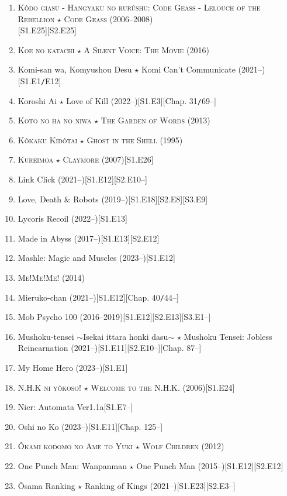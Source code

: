 \documentclass{article}
\begin{document}
\begin{enumerate}
    \item \textsc{Kôdo giasu - Hangyaku no rurûshu: Code Geass - Lelouch of the Rebellion $\star$ Code Geass} (2006--2008)\\\mbox{}\hfill[S1.E25][S2.E25]
    \item \textsc{Koe no katachi $\star$ A Silent Voice: The Movie} (2016)
    \item Komi-san wa, Komyushou Desu $\star$ Komi Can't Communicate (2021--)\hfill[S1.E1\texttt{/}E12]
    \item Koroshi Ai $\star$ Love of Kill (2022--)\hfill[S1.E3][Chap. 31\texttt{/}69--]
    \item \textsc{Koto no ha no niwa $\star$ The Garden of Words} (2013)
    \item \textsc{K\^okaku Kid\^otai $\star$ Ghost in the Shell} (1995)
    \item \textsc{Kureimoa $\star$ Claymore} (2007)\hfill[S1.E26]
    \item Link Click (2021--)\hfill[S1.E12][S2.E10--]
    \item Love, Death \& Robots (2019--)\hfill[S1.E18][S2.E8][S3.E9]
    \item Lycoris Recoil (2022--)\hfill[S1.E13]
    \item Made in Abyss (2017--)\hfill[S1.E13][S2.E12]
    \item Mashle: Magic and Muscles (2023--)\hfill[S1.E12]
    \item \textsc{Me!Me!Me!} (2014)
    \item Mieruko-chan (2021--)\hfill[S1.E12][Chap. 40\texttt{/}44--]
    \item Mob Psycho 100 (2016--2019)\hfill[S1.E12][S2.E13][S3.E1--]
    \item Mushoku-tensei $\sim$Isekai ittara honki dasu$\sim$ $\star$ Mushoku Tensei: Jobless Reincarnation (2021--)\hfill[S1.E11][S2.E10--][Chap. 87--]
    \item My Home Hero (2023--)\hfill[S1.E1]
    \item \textsc{N.H.K ni yôkoso! $\star$ Welcome to the N.H.K.} (2006)\hfill[S1.E24]
    \item Nier: Automata Ver1.1a\hfill[S1.E7--]
    \item Oshi no Ko (2023--)\hfill[S1.E11][Chap. 125--]
    \item \textsc{\^Okami kodomo no Ame to Yuki $\star$ Wolf Children} (2012)
    \item One Punch Man: Wanpanman $\star$ One Punch Man (2015--)\hfill[S1.E12][S2.E12]
    \item \^Osama Ranking $\star$ Ranking of Kings (2021--)\hfill[S1.E23][S2.E3--]

\end{enumerate}
\end{document}
